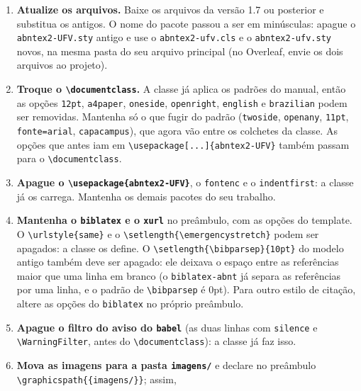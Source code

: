 \begin{enumerate}
  \item \textbf{Atualize os arquivos.} Baixe os arquivos da versão 1.7 ou posterior e substitua os antigos.
        O nome do pacote passou a ser em minúsculas: apague o \texttt{abntex2-UFV.sty} antigo
        e use o \texttt{abntex2-ufv.cls} e o \texttt{abntex2-ufv.sty} novos, na mesma pasta do
        seu arquivo principal (no Overleaf, envie os dois arquivos ao projeto).
  \item \textbf{Troque o \texttt{\textbackslash documentclass}.} A classe já aplica os padrões
        do manual, então as opções \texttt{12pt}, \texttt{a4paper}, \texttt{oneside},
        \texttt{openright}, \texttt{english} e \texttt{brazilian} podem ser removidas. Mantenha
        só o que fugir do padrão (\texttt{twoside}, \texttt{openany}, \texttt{11pt},
        \texttt{fonte=arial}, \texttt{capacampus}), que agora vão entre os colchetes da classe.
        As opções que antes iam em \texttt{\textbackslash usepackage[...]\{abntex2-UFV\}}
        também passam para o \texttt{\textbackslash documentclass}.
  \item \textbf{Apague o \texttt{\textbackslash usepackage\{abntex2-UFV\}}}, o
        \texttt{fontenc} e o \texttt{indentfirst}: a classe já os carrega. Mantenha os
        demais pacotes do seu trabalho.
  \item \sloppy\textbf{Mantenha o \texttt{biblatex} e o \texttt{xurl}} no preâmbulo, com as
        opções do template. O \texttt{\textbackslash urlstyle\{same\}} e o
        \texttt{\textbackslash setlength\{\textbackslash emergencystretch\}} podem ser apagados:
        a classe os define. O \texttt{\textbackslash setlength\{\textbackslash bibparsep\}\{10pt\}}
        do modelo antigo também deve ser apagado: ele deixava o espaço entre as referências
        maior que uma linha em branco (o \texttt{biblatex-abnt} já separa as referências por
        uma linha, e o padrão de \texttt{\textbackslash bibparsep} é 0pt). Para outro estilo de
        citação, altere as opções do \texttt{biblatex} no próprio preâmbulo.
  \item \textbf{Apague o filtro do aviso do \texttt{babel}} (as duas linhas com
        \texttt{silence} e \texttt{\textbackslash WarningFilter}, antes do
        \texttt{\textbackslash documentclass}): a classe já faz isso.
  \item \textbf{Mova as imagens para a pasta \texttt{imagens/}} e declare no preâmbulo
        \texttt{\textbackslash graphicspath\allowbreak\{\{imagens/\}\}}; assim,

\end{enumerate}
